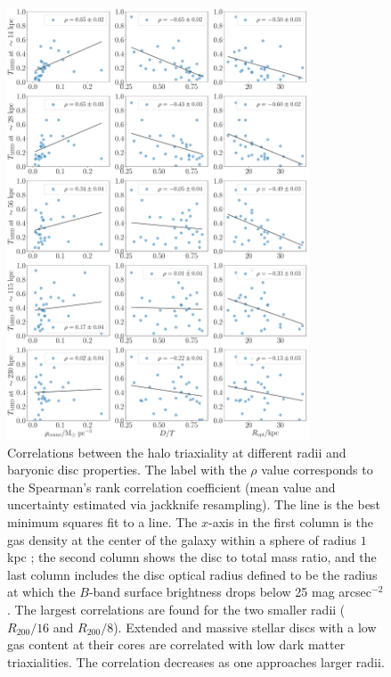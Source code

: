 \documentclass[usenatbib]{mnras}
\begin{document}
\begin{figure}
\begin{center}
\includegraphics[width=0.8\textwidth]{correlation_T_MHD_disc.pdf}
\end{center}
\caption{Correlations between the halo triaxiality at different radii
  and baryonic disc properties. 
  The label with the $\rho$ value corresponds to the Spearman's rank
  correlation coefficient (mean value and uncertainty estimated via
  jackknife resampling).
  The line is the best minimum squares fit to a line.
  The $x$-axis in the first column is the gas density at the center of
  the galaxy within a sphere of radius  $1$ kpc \citep{Pakmor17};
  the second column shows the disc to total mass ratio, and the last
  column includes the disc optical radius defined to be the radius at which the
  $B$-band surface brightness drops below 25 mag arcsec$^{-2}$ \citep{auriga}.
  The largest correlations are found for the two smaller radii
  ($R_{200}/16$ and $R_{200}/8$).
  Extended and massive stellar discs with a low gas content at their
  cores are correlated with low dark matter triaxialities.
  The correlation decreases as one approaches larger radii.}
\label{fig:disc_correlations}
\end{figure}
\end{document}
